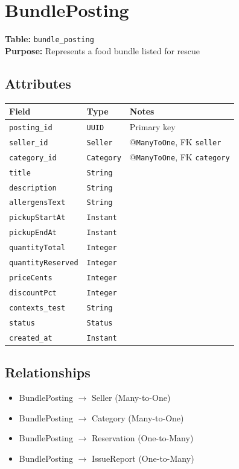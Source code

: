 \documentclass[a4paper,11pt]{article}
\begin{document}
\section{BundlePosting}

\textbf{Table:} \texttt{bundle\_posting} \\
\textbf{Purpose:} Represents a food bundle listed for rescue

\subsection*{Attributes}
\begin{longtable}{|p{4cm}|p{3cm}|p{6cm}|}
\hline
\textbf{Field} & \textbf{Type} & \textbf{Notes} \\
\hline
\texttt{posting\_id} & \texttt{UUID} & Primary key \\
\texttt{seller\_id} & \texttt{Seller} & @\texttt{ManyToOne}, FK \texttt{seller} \\
\texttt{category\_id} & \texttt{Category} & @\texttt{ManyToOne}, FK \texttt{category} \\
\texttt{title} & \texttt{String} &  \\
\texttt{description} & \texttt{String} &  \\
\texttt{allergensText} & \texttt{String} &  \\
\texttt{pickupStartAt} & \texttt{Instant} &  \\
\texttt{pickupEndAt} & \texttt{Instant} &  \\
\texttt{quantityTotal} & \texttt{Integer} &  \\
\texttt{quantityReserved} & \texttt{Integer} &  \\
\texttt{priceCents} & \texttt{Integer} &  \\
\texttt{discountPct} & \texttt{Integer} &  \\
\texttt{contexts\_test} & \texttt{String} &  \\
\texttt{status} & \texttt{Status} &  \\
\texttt{created\_at} & \texttt{Instant} &  \\
\hline
\end{longtable}

\subsection*{Relationships}
\begin{itemize}
  \item BundlePosting $\rightarrow$ Seller (Many-to-One)
  \item BundlePosting $\rightarrow$ Category (Many-to-One)
  \item BundlePosting $\rightarrow$ Reservation (One-to-Many)
  \item BundlePosting $\rightarrow$ IssueReport (One-to-Many)
\end{itemize}
\end{document}
